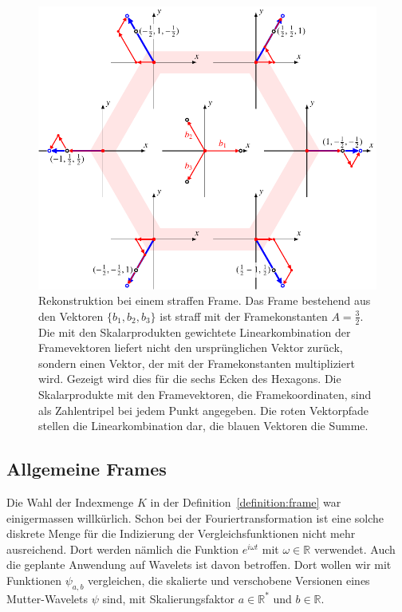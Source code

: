 \begin{figure}
\centering
\includegraphics{chapters/1-geometrie/images/hexagon3.pdf}
\caption{Rekonstruktion bei einem straffen Frame.
Das Frame bestehend aus den Vektoren $\{b_1,b_2,b_3\}$ ist straff
mit der Framekonstanten $A=\frac32$.
Die mit den Skalarprodukten gewichtete Linearkombination der
Framevektoren liefert nicht den ursprünglichen Vektor zurück, sondern
einen Vektor, der mit der Framekonstanten multipliziert wird.
Gezeigt wird dies für die sechs Ecken des Hexagons.
Die Skalarprodukte mit den Framevektoren, die Framekoordinaten, sind
als Zahlentripel bei jedem Punkt angegeben.
Die roten Vektorpfade stellen die Linearkombination dar, die blauen
Vektoren die Summe.
\label{geometrie:hexagon:rekonstruktion}}
\end{figure}

\subsection{Allgemeine Frames}
Die Wahl der Indexmenge $K$ in der Definition~\ref{definition:frame}
war einigermassen willkürlich.
Schon bei der Fouriertransformation ist eine solche diskrete Menge
für die Indizierung der Vergleichsfunktionen nicht mehr ausreichend.
Dort werden nämlich die Funktion $e^{i\omega t}$ mit $\omega\in\mathbb R$
verwendet.
Auch die geplante Anwendung auf Wavelets ist davon betroffen.
Dort wollen wir mit Funktionen $\psi_{a,b}$ vergleichen, die 
skalierte und verschobene Versionen eines Mutter-Wavelets $\psi$ sind,
mit Skalierungsfaktor $a\in\mathbb R^*$ und $b\in \mathbb R$.

